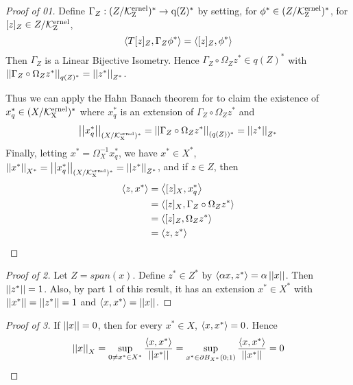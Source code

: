 \begin{thm}
\begin{proof}[Proof of 01]
    Define $\Gamma_Z:(Z/\bf\mathcal{K}\rm^{ernel}_Z)^* \to q(Z)^*$ by setting, 
    for $\phi^* \in (Z/\bf\mathcal{K}\rm^{ernel}_Z)^*$, 
    for $[z]_Z \in Z/\bf\mathcal{K}\rm^{ernel}_Z$, 
    \begin{equation}
        \left\langle T[z]_Z, \Gamma_Z \phi^* \right\rangle = \left\langle [z]_Z, \phi^* \right\rangle
    \end{equation}
    Then $\Gamma_Z$ is a Linear Bijective Isometry. 
    Hence $\Gamma_Z \circ \Omega_Z z^* \in q(Z)^*$ with 
    $\left|\left| \Gamma_Z \circ \Omega_Z z^* \right|\right|_{q(Z)^*} = \left|\left| z^* \right|\right|_{Z^*}$. 

    Thus we can apply the Hahn Banach theorem for \NormedSpaces to claim 
    the existence of $x_q^* \in (X/\bf\mathcal{K}\rm^{ernel}_X)^*$ where
    $x_q^*$ is an extension of $\Gamma_Z \circ \Omega_Z z^*$ and
    \begin{equation}
        \left|\left| x_q^* \right|\right|_{(X/\bf\mathcal{K}\rm^{ernel}_X)^*} = \left|\left| \Gamma_Z \circ \Omega_Z z^* \right|\right|_{(q(Z))^*} = \left|\left| z^* \right|\right|_{Z^*}
    \end{equation}
    Finally, letting $x^* = \Omega_X^{-1} x_q^*$, we have 
    $x^* \in X^*$, 
    $\left|\left| x^* \right|\right|_{X^*} = \left|\left| x_q^* \right|\right|_{(X/\bf\mathcal{K}\rm^{ernel}_X)^*} =\left|\left| z^* \right|\right|_{Z^*}$, 
    and 
    if $z \in Z$, then 
    \begin{align*}
        \left\langle z, x^* \right\rangle & = \left\langle [z]_X, x_q^* \right\rangle \\
        & = \left\langle [z]_X, \Gamma_Z \circ \Omega_Zz^* \right\rangle\\
        & = \left\langle [z]_Z, \Omega_Z z^* \right\rangle\\
        & = \left\langle z, z^* \right\rangle
    \end{align*}
\end{proof}

\begin{proof}[Proof of 2]
    Let $Z=span(x)$. 
    Define $z^* \in Z^*$ by 
    $\left\langle \alpha x, z^* \right\rangle = \alpha \left|\left| x \right|\right|$. 
    Then $\left|\left| z^* \right|\right| = 1$. 
    Also, by part 1 of this result, 
    it has an extension $x^* \in X^*$ with 
    $\left|\left| x^* \right|\right| = \left|\left| z^* \right|\right| =1$ 
    and $\left\langle x,x^* \right\rangle = \left|\left| x \right|\right|$. 
\end{proof}
\begin{proof}[Proof of 3]
    If $\left|\left| x \right|\right| = 0$, then
    for every $x^* \in X$, $\left\langle x,x^* \right\rangle = 0$.
    Hence 
    \begin{equation} 
    \left|\left| x \right|\right|_X = \sup\limits_{0 \neq x^* \in X^*} \frac{\left\langle x,x^* \right\rangle}{\left|\left| x^* \right|\right|} = \sup\limits_{x^* \in \partial B_{X^*}(0;1)} \frac{\left\langle x,x^* \right\rangle}{\left|\left| x^* \right|\right|}=0
    \end{equation}


\end{proof}
\end{thm}
